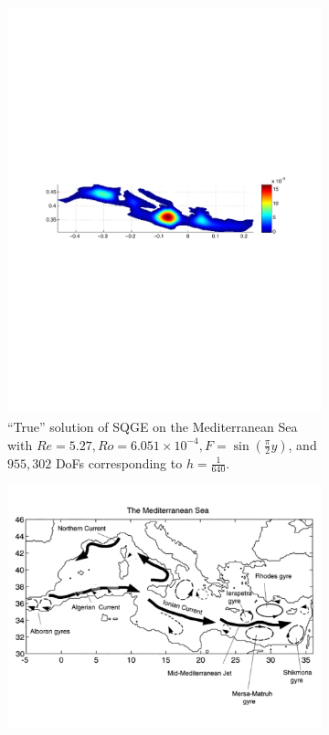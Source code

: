\begin{figure}
  \begin{subfigure}[b]{\textwidth}
  \begin{center}
    \includegraphics{Figures/SQGEMedRe5_27Ro6_051E-4h320sin0_25piy.pdf}
    \caption{``True'' solution of SQGE on the Mediterranean Sea with $Re = 5.27, Ro
      = 6.051\times 10^{-4}, F = \sin( \frac{\pi}{2} y)$, and $955,302$ DoFs
      corresponding to $h = \frac{1}{640}$.}
    \label{fig:SQGEMed}
  \end{center}
  \end{subfigure}
  \begin{subfigure}[b]{\textwidth}
    \begin{center}
      \includegraphics[scale=0.5]{Figures/GyresOfMediterranean.pdf}

\end{center}
\end{subfigure}
\end{figure}
